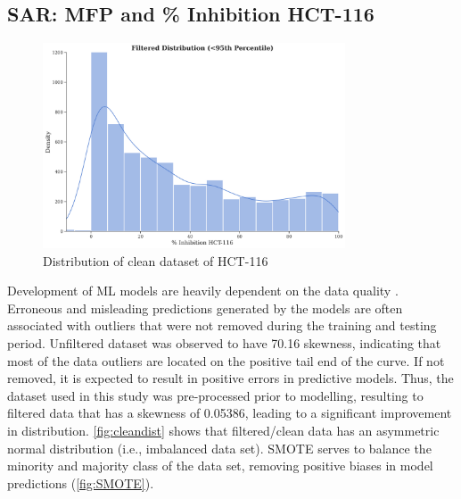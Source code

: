 \subsection*{SAR: MFP and \% Inhibition HCT-116}
\begin{figure}[htbp!] %
	\centering
	\hspace{-1cm}
	\includegraphics[width=0.8\textwidth]{cleandatadist.png}%
	\caption{Distribution of clean dataset of HCT-116}
	\label{fig:cleandist} %
\end{figure}

Development of ML models are heavily dependent on the data quality \cite{zhou2024dataquality}. Erroneous and misleading predictions generated by the models are often associated with outliers that were not removed during the training and testing period. Unfiltered dataset was observed to have 70.16 skewness, indicating that most of the data outliers are located on the positive tail end of the curve. If not removed, it is expected to result in positive errors in predictive models. Thus, the dataset used in this study was pre-processed prior to modelling, resulting to filtered data that has a  skewness of 0.05386, leading to a significant improvement in distribution. \autoref{fig:cleandist} shows that filtered/clean data has an asymmetric normal distribution (i.e., imbalanced data set). SMOTE serves to balance the minority and majority class of the data set, removing positive biases in model predictions (\autoref{fig:SMOTE}).

